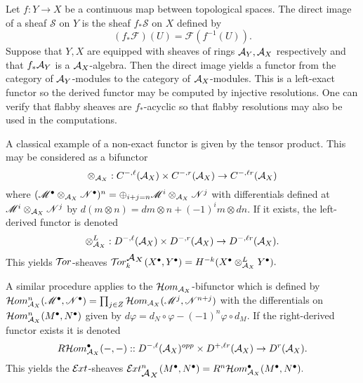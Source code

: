 Let $f:Y\to X$ be a continuous map between topological spaces.
The direct image of a sheaf $\mathcal{S}$ on $Y$ is the sheaf $f_*\mathcal{S}$ on $X$ defined by
$$(f_*\mathcal{F})(U) = \mathcal{F}(f^{-1}(U)). $$
Suppose that $Y,X$ are equipped with sheaves of rings $\AA_Y, \AA_X$ respectively and that $f_*\AA_Y$ is a $\AA_X$-algebra.
Then the direct image yields a functor from the category of $\AA_Y$-modules to the category of $\AA_X$-modules.
This is a left-exact functor so the derived functor may be computed by injective resolutions.
One can verify that flabby sheaves are $f_*$-acyclic so that flabby resolutions may also be used in the computations.

A classical example of a non-exact functor is given by the tensor product.
This may be considered as a bifunctor
$$ \otimes_{\AA_X} : C^{-,\ell}(\AA_X)\times C^{-,r}(\AA_X)\to C^{-,\ell r}(\AA_X)$$
where
$(\M^\bullet \otimes_{\AA_X} \N^\bullet)^n = \oplus_{i + j = n} \M^i \otimes_{\AA_X} \N^j $
with differentials defined at $\M^i \otimes_{\AA_X} \N^j$ by
$d(m\otimes n) = dm \otimes n + (-1)^i m \otimes dn.$
If it exists, the left-derived functor is denoted
$$ \otimes_{\AA_X}^L : D^{-,\ell}(\AA_X)\times D^{-,r}(\AA_X)\to D^{-,\ell r}(\AA_X).$$
This yields $\Tor$-sheaves
$\Tr{\AA_X}{k}(X^\bullet, Y^\bullet) = H^{-k}(X^\bullet\otimes_{\AA_X}^L Y^\bullet).$

A similar procedure applies to the $\Hom_{\AA_X}$-bifunctor which is defined by
$\Hom_{\AA_X}^n(\M^\bullet, \N^\bullet) \ab = \prod_{j\in Z} \Hom_{\AA_X}(\M^j , \N^{n+j}) $
with the differentials on $\Hom_{\AA_X}^n(M^\bullet,N^\bullet)$ given by $d\varphi = d_N\circ \varphi - (-1)^n \varphi \circ d_M$.
If the right-derived functor exists it is denoted
$$R\Hom_{\AA_X}^\bullet(\blank,\blank):: D^{-,\ell}(\AA_X)^{opp}\times D^{+,\ell r}(\AA_X)\to D^{r}(\AA_X).$$
This yields the $\Ext$-sheaves
$\Ex{\AA_X}{n}(M^\bullet,N^\bullet) =  R^n\Hom_{\AA_X}^\bullet(M^\bullet, N^\bullet).$

